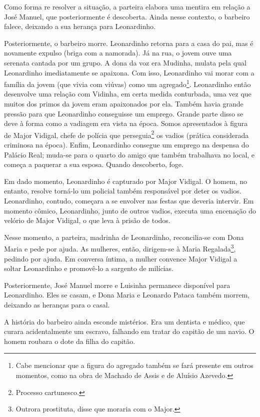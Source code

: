 \documentclass[12pt]{book}
\begin{document}
				\par Como forma re resolver a situação, a parteira elabora uma mentira em relação a José Manuel, que posteriormente é descoberta. Ainda nesse contexto, o barbeiro falece, deixando a sua herança para Leonardinho.
				\par Posteriormente, o barbeiro morre. Leonardinho retorna para a casa do pai, mas é novamente expulso (briga com a namorada). Já na rua, o jovem ouve uma serenata cantada por um grupo. A dona da voz era Mudinha, mulata pela qual Leonardinho imediatamente se apaixona. Com isso, Leonardinho vai morar com a família da jovem (que vivia com viúvas) como um agregado\footnote{Cabe mencionar que a figura do agregado também se fará presente em outros momentos, como na obra de Machado de Assis e de Aluísio Azevedo.}. Leonardinho então desenvolve uma relação com Vidinha, em certa medida conturbada, uma vez que muitos dos primos da jovem eram apaixonados por ela. Também havia grande pressão para que Leonardinho conseguisse um emprego. Grande parte disso se deve à forma como a vadiagem era vista na época. Somos apresentados à figura de Major Vidigal, chefe de polícia que perseguia\footnote{Processo cartunesco.} os vadios (prática considerada criminosa na época). Enfim, Leonardinho consegue um emprego na despensa do Palácio Real; muda-se para o quarto do amigo que também trabalhava no local, e começa a paquerar a sua esposa. Quando descoberto, foge.
				\par Em dado momento, Leonardinho é capturado por Major Vidigal. O homem, no entanto, resolve torná-lo um policial também responsável por deter os vadios. Leonardinho, contudo, começara a se envolver nas festas que deveria intervir. Em momento cômico, Leonardinho, junto de outros vadios, executa uma encenação do velório de Major Vidigal, o que leva à prisão de todos.
				\par Nesse momento, a parteira, madrinha de Leonardinho, reconcilia-se com Dona Maria e pede por ajuda. As mulheres, então, dirigem-se à Maria Regalada\footnote{Outrora prostituta, disse que moraria com o Major.}, pedindo por ajuda. Em conversa íntima, a mulher convence Major Vidigal a soltar Leonardinho e promovê-lo a sargento de milícias.
				\par Posteriormente, José Manuel morre e Luisinha permanece disponível para Leonardinho. Eles se casam, e Dona Maria e Leonardo Pataca também morrem, deixando as heranças para o casal.
				\par A história do barbeiro ainda esconde mistérios. Era um dentista e médico, que curara acidentalmente um escravo, falhando em tratar do capitão de um navio. O homem roubara o dote da filha do capitão.
\end{document}
